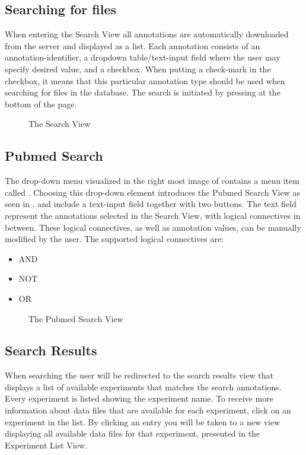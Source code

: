 \subsection{Searching for files}\label{sec:and_search}

When entering the Search View all annotations are automatically downloaded from the server and displayed as a list. Each annotation consists of an annotation-identifier, a dropdown table/text-input field where the user may specify desired value, and a checkbox. When putting a check-mark in the checkbox, it means that this particular annotation type should be used when searching for files in the database. The search is initiated by pressing  at the bottom of the
page.

\begin{figure}[h]
\caption{The Search View}
\label{fig:and_search_man}
\end{figure}
\FloatBarrier

\subsection{Pubmed Search}
The drop-down menu visualized in the right most image of  contains a menu item called . Choosing this drop-down element introduces the Pubmed Search View as seen in , and include a text-input field together with two buttons. The text field represent the annotations selected in the Search View, with logical connectives in between. These logical connectives, as well as annotation values, can be manually modified by the user. The supported logical connectives are: 

\begin{itemize}
\item AND
\item NOT
\item OR
\end{itemize}

\begin{figure}[h]
\caption{The Pubmed Search View}
\label{fig:and_pubmed_man} 
\end{figure}
\FloatBarrier


\subsection{Search Results}
When searching the user will be redirected to the search results view  that displays a list of available experiments that matches the search annotations. Every experiment is listed showing the experiment name. To receive more information about data files that are available for each experiment, click on an experiment in the list. By clicking an entry you will be taken to a new view displaying all available data files for that experiment, presented in the Experiment List View. 

